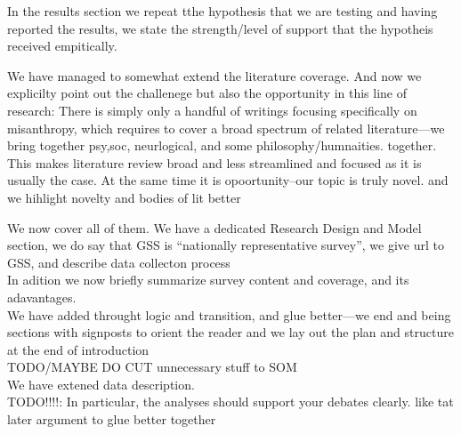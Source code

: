 In the results section we repeat tthe hypothesis that we are testing and having
reported the results, we state the strength/level of support that the hypotheis received empitically.


We have managed to somewhat extend the literature coverage.
And now we explicilty point out the challenege but also the opportunity in this line
of research: There is simply only a handful of writings focusing specifically on
misanthropy, which requires to cover a broad spectrum of related
literature---we bring together psy,soc, neurlogical, and some philosophy/humnaities.
together. This makes literature review broad and less streamlined and focused
as it is usually the case. At the same time it is opoortunity--our topic is
truly novel.  and we hihlight novelty and bodies of lit better


We now cover all of them. We have a dedicated Research Design and Model section,
we do say that GSS is ``nationally
representative survey'', we give url to GSS, and describe data collecton process\\

In adition we now briefly summarize survey content and coverage, and its adavantages.\\

We have added throught logic and transition, and glue better---we end and being
sections with signposts to orient the reader and we lay out the plan and
structure at the end of introduction\\


TODO/MAYBE  DO CUT unnecessary stuff to SOM\\

We have extened data description.\\

TODO!!!!: In particular, the analyses should support your debates clearly. like tat
later argument to glue better together\\

